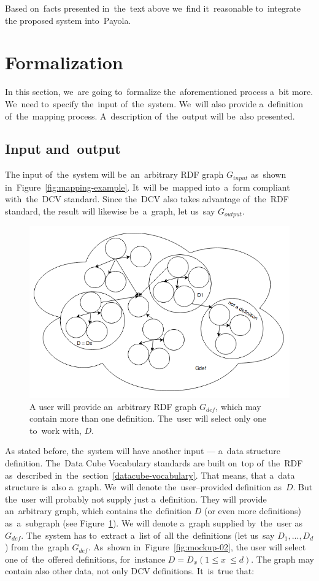 Based on~facts presented in~the~text above we~find it~reasonable to~integrate 
the proposed system into~Payola.

\section{Formalization}

In this section, we~are going to~formalize the~aforementioned process a~bit 
more. We~need to~specify the~input of~the~system. We~will also 
provide a~definition of~the~mapping process. A~description of~the~output will be~also presented.

\subsection{Input and~output}

The input of~the~system will be~an~arbitrary RDF graph $G_{input}$ as~shown
in~Figure~\ref{fig:mapping-example}. It~will be~mapped into~a~form compliant
with~the~DCV standard. Since the~DCV also takes advantage of~the~RDF standard,
the result will likewise be~a~graph, let us~say $G_{output}$.

\begin{figure}
	\centering
	\includegraphics[width=120mm]{img/definition-in-graph.png}
	\caption{A user will provide an~arbitrary RDF graph $G_{def}$, which may contain more than one definition. The~user will select only one to~work with, $D$.}
	\label{fig:definition-in-graph}
\end{figure}

As stated before, the~system will have another input --- a~data structure 
definition. The~Data Cube Vocabulary standards are built on~top of~the~RDF as~described in~the~section~\ref{datacube-vocabulary}. That means, that a~data structure is~also a~graph. We~will denote the~user--provided definition as~$D$. But the~user will probably not 
supply just a~definition. They will provide an~arbitrary graph, which contains the~definition $D$ 
(or even more definitions) as~a~subgraph (see Figure~\ref{fig:definition-in-graph}).
We will denote a~graph
supplied by~the~user as~$G_{def}$. The~system has to~extract a~list of~all the~definitions
(let us~say $D_1, ..., D_d$) from the~graph $G_{def}$. As~shown in~Figure~\ref{fig:mockup-02},
the user will select one of~the~offered definitions, for~instance $D = D_x (1 \leq x~\leq d)$.
The graph may contain also other data, not only DCV definitions. It~is~true 
that:\\


